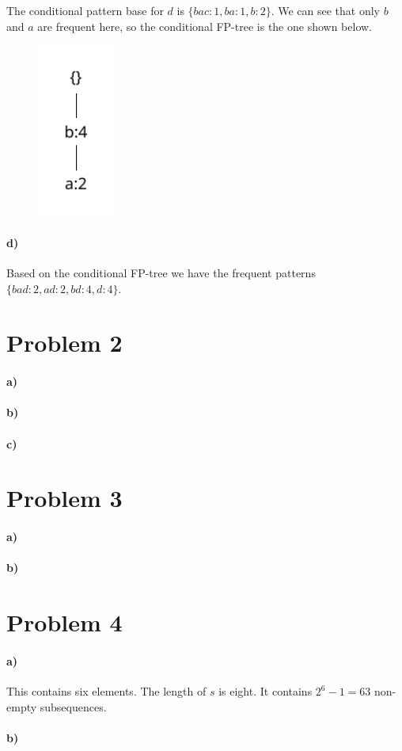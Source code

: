 \documentclass[12pt]{article}
\begin{document}
The conditional pattern base for \(d\) is \(\{bac:1, ba:1, b:2\}\). We can see that only \(b\) and \(a\) are
frequent here, so the conditional FP-tree is the one shown below.
\begin{figure}[H]
    \begin{center}
        \includegraphics[width=1in]{problem1c.pdf}
    \end{center}
\end{figure}

\paragraph{d)}

Based on the conditional FP-tree we have the frequent patterns \(\{bad:2, ad:2, bd:4, d:4\}\).

\section*{Problem 2}

\paragraph{a)}

\paragraph{b)}

\paragraph{c)}

\section*{Problem 3}

\paragraph{a)}

\paragraph{b)}

\section*{Problem 4}

\paragraph{a)}

This contains six elements. The length of \(s\) is eight. It contains \(2^6-1=63\) non-empty subsequences.

\paragraph{b)}
\end{document}
